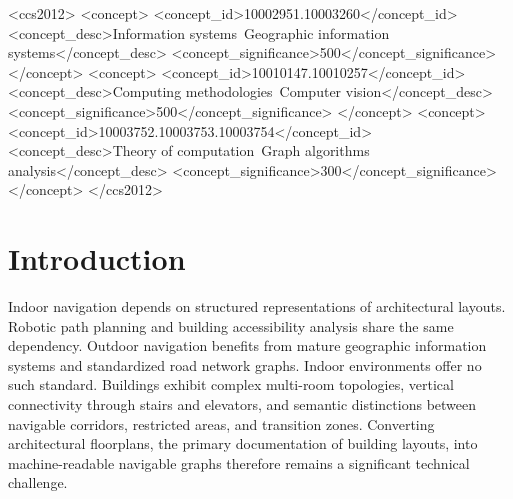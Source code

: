 \documentclass[manuscript,screen,review]{acmart}
\begin{document}
\begin{CCSXML}
<ccs2012>
 <concept>
  <concept_id>10002951.10003260</concept_id>
  <concept_desc>Information systems~Geographic information systems</concept_desc>
  <concept_significance>500</concept_significance>
 </concept>
 <concept>
  <concept_id>10010147.10010257</concept_id>
  <concept_desc>Computing methodologies~Computer vision</concept_desc>
  <concept_significance>500</concept_significance>
 </concept>
 <concept>
  <concept_id>10003752.10003753.10003754</concept_id>
  <concept_desc>Theory of computation~Graph algorithms analysis</concept_desc>
  <concept_significance>300</concept_significance>
 </concept>
</ccs2012>
\end{CCSXML}



\maketitle

\section{Introduction}
\label{sec:introduction}

Indoor navigation depends on structured representations of architectural layouts. Robotic path planning and building accessibility analysis share the same dependency. Outdoor navigation benefits from mature geographic information systems and standardized road network graphs. Indoor environments offer no such standard. Buildings exhibit complex multi-room topologies, vertical connectivity through stairs and elevators, and semantic distinctions between navigable corridors, restricted areas, and transition zones. Converting architectural floorplans, the primary documentation of building layouts, into machine-readable navigable graphs therefore remains a significant technical challenge.
\end{document}
